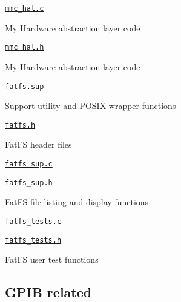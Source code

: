 \begin{DoxyItemize}
\begin{DoxyItemize}
\item \href{fatfs.hal/mmc_hal.c}{\tt mmc\+\_\+hal.\+c}
\begin{DoxyItemize}
\item My Hardware abstraction layer code
\end{DoxyItemize}
\item \href{fatfs.hal/mmc_hal.h}{\tt mmc\+\_\+hal.\+h}
\begin{DoxyItemize}
\item My Hardware abstraction layer code
\end{DoxyItemize}
\end{DoxyItemize}
\item \href{fatfs.sup/fatfs.sup}{\tt fatfs.\+sup}
\begin{DoxyItemize}
\item Support utility and P\+O\+S\+IX wrapper functions
\item \href{fatfs.sup/fatfs.h}{\tt fatfs.\+h}
\begin{DoxyItemize}
\item Fat\+FS header files
\end{DoxyItemize}
\item \href{fatfs.sup/fatfs_sup.c}{\tt fatfs\+\_\+sup.\+c}
\item \href{fatfs.sup/fatfs_sup.h}{\tt fatfs\+\_\+sup.\+h}
\begin{DoxyItemize}
\item Fat\+FS file listing and display functions
\end{DoxyItemize}
\item \href{fatfs.sup/fatfs_tests.c}{\tt fatfs\+\_\+tests.\+c}
\item \href{fatfs.sup/fatfs_tests.h}{\tt fatfs\+\_\+tests.\+h}
\begin{DoxyItemize}
\item Fat\+FS user test functions
\end{DoxyItemize}
\end{DoxyItemize}
\end{DoxyItemize}

\subsection*{G\+P\+IB related}


